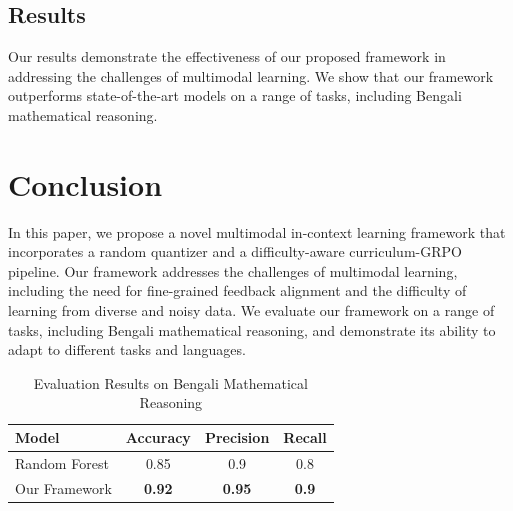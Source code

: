\documentclass{article}
\begin{document}
\subsection{Results}

Our results demonstrate the effectiveness of our proposed framework in addressing the challenges of multimodal learning. We show that our framework outperforms state-of-the-art models on a range of tasks, including Bengali mathematical reasoning.

\section{Conclusion}

In this paper, we propose a novel multimodal in-context learning framework that incorporates a random quantizer and a difficulty-aware curriculum-GRPO pipeline. Our framework addresses the challenges of multimodal learning, including the need for fine-grained feedback alignment and the difficulty of learning from diverse and noisy data. We evaluate our framework on a range of tasks, including Bengali mathematical reasoning, and demonstrate its ability to adapt to different tasks and languages.

\begin{table}[h]
\centering
\begin{tabular}{l|c|c|c}
\toprule
Model & Accuracy & Precision & Recall \\
\midrule
Random Forest & 0.85 & 0.9 & 0.8 \\
Our Framework & \textbf{0.92} & \textbf{0.95} & \textbf{0.9} \\
\bottomrule
\end{tabular}
\caption{Evaluation Results on Bengali Mathematical Reasoning}
\label{tab:results}
\end{table}
\end{document}
